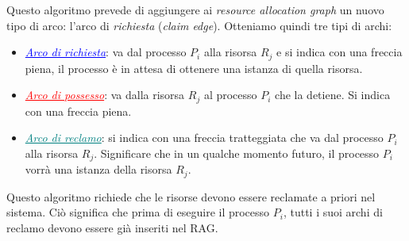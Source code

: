 \documentclass[a4paper,12pt, twoside]{report}
\begin{document}
Questo algoritmo prevede di aggiungere ai \emph{resource allocation graph} un nuovo tipo di arco: l'arco di \emph{richiesta} (\emph{claim edge}). Otteniamo quindi tre tipi di archi:
\begin{itemize}
\item \textcolor{blue}{\underline{\emph{Arco di richiesta}}}: va dal processo $P_i$ alla risorsa $R_j$ e si indica con una freccia piena, il processo \`e in attesa di ottenere una istanza di quella risorsa.
\begin{center}
\end{center}
\item \textcolor{red}{\underline{\emph{Arco di possesso}}}: va dalla risorsa $R_j$ al processo $P_i$ che la detiene. Si indica con una freccia piena.
\begin{center}
\end{center}
\item \textcolor{teal}{\underline{\emph{Arco di reclamo}}}: si indica con una freccia tratteggiata che va dal processo $P_i$ alla risorsa $R_j$. Significare che in un qualche momento futuro, il processo $P_i$ vorr\`a una istanza della risorsa $R_j$.
\begin{center}
\end{center}
\end{itemize}

Questo algoritmo richiede che le risorse devono essere reclamate a priori nel sistema. Ci\`o significa che prima di eseguire il processo $P_i$, tutti i suoi archi di reclamo devono essere gi\`a inseriti nel RAG. 
\end{document}
